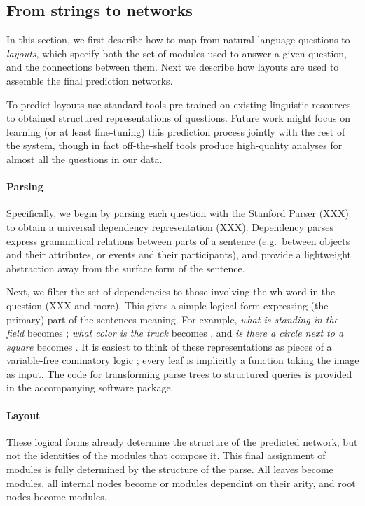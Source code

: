 \documentclass[10pt,twocolumn,letterpaper]{article}
\begin{document}
\subsection{From strings to networks}

In this section, we first describe how to map from natural language questions to
\emph{layouts}, which specify both the set of modules used to answer a given
question, and the connections between them. Next we describe how layouts are
used to assemble the final prediction networks.

To predict layouts use standard tools pre-trained on existing linguistic
resources to obtained structured representations of questions. Future work might
focus on learning (or at least fine-tuning) this prediction process jointly with
the rest of the system, though in fact off-the-shelf tools produce high-quality
analyses for almost all the questions in our data.

\paragraph{Parsing}
Specifically, we begin by parsing each question with the Stanford Parser (XXX)
to obtain a universal dependency representation (XXX). Dependency parses express
grammatical relations between parts of a sentence (e.g.\ between objects and
their attributes, or events and their participants), and provide a lightweight
abstraction away from the surface form of the sentence.

Next, we filter the set of dependencies to those involving the wh-word in the
question (XXX and more). This gives a simple logical form expressing (the
primary) part of the sentences meaning. For example, \emph{what is standing in
the field} becomes ; \emph{what color is the truck} becomes
, and \emph{is there a circle next to a square} becomes
. It is easiest to think of these
representations as pieces of a variable-free cominatory logic \cite{Liang13DCS};
every leaf is implicitly a function taking the image as input. The code for
transforming parse trees to structured queries is provided in the accompanying
software package.

\paragraph{Layout}
These logical forms already determine the structure of the predicted network,
but not the identities of the modules that compose it. This final assignment of
modules is fully determined by the structure of the parse. All leaves become
 modules, all internal nodes become  or 
modules dependint on their arity, and root nodes become  modules.
\end{document}
